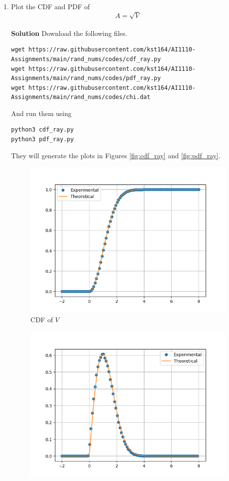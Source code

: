 \documentclass[journal, 12pt, twocolumn]{IEEEtran}
\begin{document}
\begin{enumerate}[label=\arabic{section}.\arabic*]
    \item
        Plot the CDF and PDF of
        \begin{equation}
            A = \sqrt{V}
        \end{equation}
        \\
        \textbf{Solution} Download the following files.
        \begin{lstlisting}
wget https://raw.githubusercontent.com/kst164/AI1110-Assignments/main/rand_nums/codes/cdf_ray.py
wget https://raw.githubusercontent.com/kst164/AI1110-Assignments/main/rand_nums/codes/pdf_ray.py
wget https://raw.githubusercontent.com/kst164/AI1110-Assignments/main/rand_nums/codes/chi.dat
        \end{lstlisting}
        And run them using
        \begin{lstlisting}
python3 cdf_ray.py
python3 pdf_ray.py
        \end{lstlisting}
        They will generate the plots in Figures \eqref{fig:cdf_ray} and \eqref{fig:pdf_ray}.
        \begin{figure}[!ht]
            \includegraphics[width=\columnwidth]{figs/cdf_ray.png}
            \caption{CDF of $V$}
            \label{fig:cdf_ray}
        \end{figure}
        \begin{figure}[!ht]
            \includegraphics[width=\columnwidth]{figs/pdf_ray.png}

\end{figure}
\end{enumerate}
\end{document}
